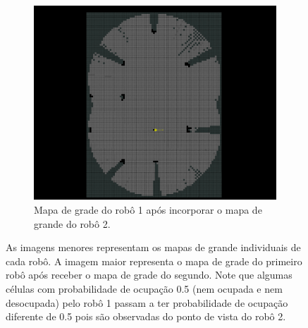 \begin{figure}[]
\begin{subfigure}{0.45\textwidth}
  \end{subfigure}
  \begin{subfigure}{0.65\textwidth}
    \includegraphics[width=\textwidth]{figs/map-merge.png}
    \caption{Mapa de grade do robô 1 após incorporar o mapa de grande 
      do robô 2. }
  \end{subfigure}
  \caption{As imagens menores representam os mapas de grande 
  individuais de cada robô. A imagem maior representa o mapa de grade do
  primeiro robô após receber o mapa de grade do segundo. Note que algumas
  células com probabilidade de ocupação 0.5 (nem ocupada e nem desocupada) pelo robô 1 passam a ter probabilidade de ocupação diferente de 0.5 pois são observadas do ponto de vista do robô 2.}
  \label{fig:grid-map-exchange}
\end{figure}

